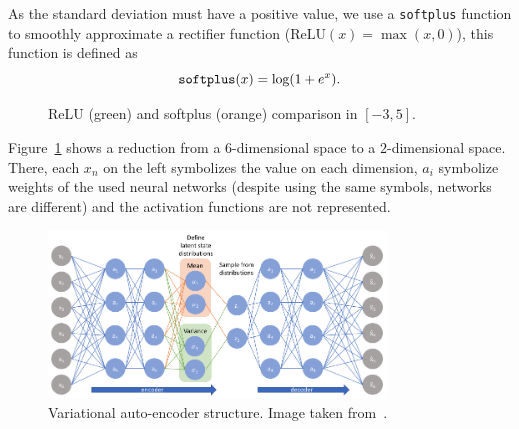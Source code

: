 As the standard deviation must have a positive value, we use a \texttt{softplus} function to smoothly approximate a rectifier function (\(\text{ReLU}(x) = \max(x,0)\)), this function is defined as
\[
  \text{\texttt{softplus}}(x) = \log(1 + e^{x}).
\]

\begin{figure}[H]
  \centering
  \caption{ReLU (green) and softplus (orange) comparison in \([-3, 5]\).}
\end{figure}

Figure~\ref{fig:vae} shows a reduction from a \(6\)-dimensional space to a \(2\)-dimensional space. There, each \(x_{n}\) on the left symbolizes the value on each dimension, \(a_{i}\) symbolize weights of the used neural networks (despite using the same symbols, networks are different) and the activation functions are not represented.

\begin{figure}[h]
  \centering
  \includegraphics[width=0.8\textwidth]{tex/images/vae.png}
  \caption{Variational auto-encoder structure. Image taken from~\cite{JeremyJordan}.}\label{fig:vae}
\end{figure}
